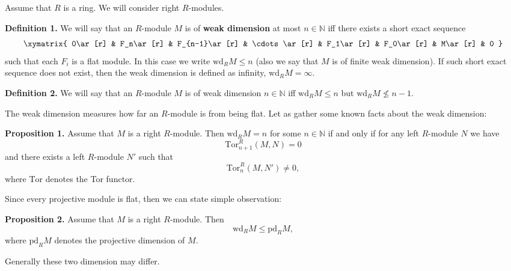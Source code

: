 \documentclass[12pt]{article}
\begin{document}
Assume that $R$ is a ring. We will consider right $R$-modules.

\textbf{Definition 1.} We will say that an $R$-module $M$ is of \textbf{weak dimension} at most $n\in\mathbb{N}$ iff there exists a short exact sequence
$$\xymatrix{
0\ar[r] & F_n\ar[r] & F_{n-1}\ar[r] & \cdots\ar[r] & F_1\ar[r] & F_0\ar[r] & M\ar[r] & 0
}$$
such that each $F_i$ is a flat module. In this case we write $\mathrm{wd}_{R}M\leqslant n$ (also we say that $M$ is of finite weak dimension). If such short exact sequence does not exist, then the weak dimension is defined as infinity, $\mathrm{wd}_R M=\infty$.

\textbf{Definition 2.} We will say that an $R$-module $M$ is of weak dimension $n\in\mathbb{N}$ iff $\mathrm{wd}_{R}M\leqslant n$ but $\mathrm{wd}_R M\not\leqslant n-1$.

The weak dimension measures how far an $R$-module is from being flat. Let as gather some known facts about the weak dimension:

\textbf{Proposition 1.} Assume that $M$ is a right $R$-module. Then $\mathrm{wd}_RM=n$ for some $n\in\mathbb{N}$ if and only if for any left $R$-module $N$ we have
$$\mathrm{Tor}_{n+1}^R(M,N)=0$$
and there exists a left $R$-module $N'$ such that
$$\mathrm{Tor}_{n}^R(M,N')\neq 0,$$
where $\mathrm{Tor}$ denotes the Tor functor.

Since every projective module is flat, then we can state simple observation:

\textbf{Proposition 2.} Assume that $M$ is a right $R$-module. Then
$$\mathrm{wd}_RM\leqslant\mathrm{pd}_RM,$$
where $\mathrm{pd}_RM$ denotes the projective dimension of $M$.

Generally these two dimension may differ.
\end{document}
